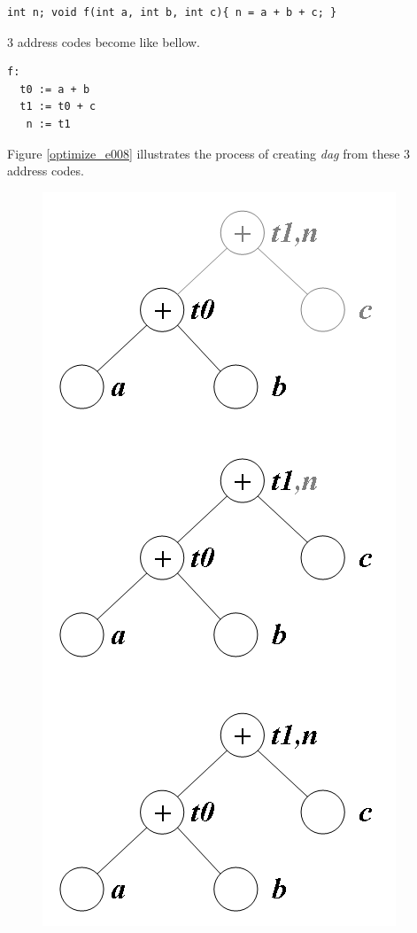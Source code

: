 \begin{Example}
\label{optimize_e007}
\begin{verbatim}
int n; void f(int a, int b, int c){ n = a + b + c; }
\end{verbatim}
3 address codes become like bellow.
\begin{verbatim}
f:
  t0 := a + b
  t1 := t0 + c
   n := t1
\end{verbatim}
Figure \ref{optimize_e008} illustrates the process of creating
{\em dag} from these 3 address codes.
\begin{figure}[htbp]
\begin{center}
\begin{htmlonly}
\includegraphics[width=0.468\linewidth,height=1.0\linewidth]{opt001.png}
\end{htmlonly}
\begin{latexonly}

\end{latexonly}
\end{center}
\end{figure}
\end{Example}
